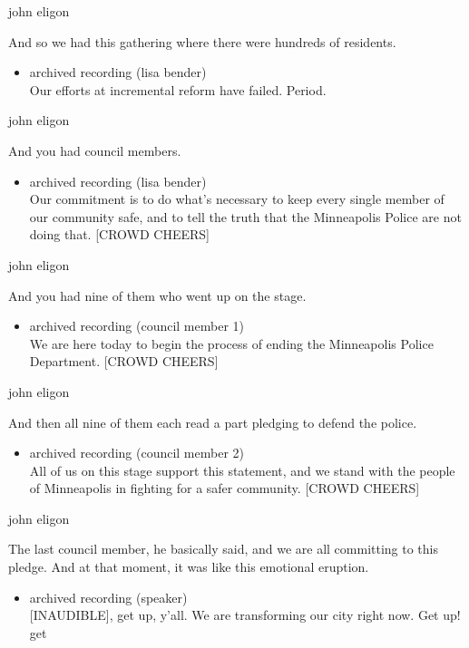 john eligon

And so we had this gathering where there were hundreds of residents.

\begin{itemize}
\tightlist
\item
  archived recording (lisa bender)\\
  Our efforts at incremental reform have failed. Period.
\end{itemize}

john eligon

And you had council members.

\begin{itemize}
\tightlist
\item
  archived recording (lisa bender)\\
  Our commitment is to do what's necessary to keep every single member
  of our community safe, and to tell the truth that the Minneapolis
  Police are not doing that. {[}CROWD CHEERS{]}
\end{itemize}

john eligon

And you had nine of them who went up on the stage.

\begin{itemize}
\tightlist
\item
  archived recording (council member 1)\\
  We are here today to begin the process of ending the Minneapolis
  Police Department. {[}CROWD CHEERS{]}
\end{itemize}

john eligon

And then all nine of them each read a part pledging to defend the
police.

\begin{itemize}
\tightlist
\item
  archived recording (council member 2)\\
  All of us on this stage support this statement, and we stand with the
  people of Minneapolis in fighting for a safer community. {[}CROWD
  CHEERS{]}
\end{itemize}

john eligon

The last council member, he basically said, and we are all committing to
this pledge. And at that moment, it was like this emotional eruption.

\begin{itemize}
\tightlist
\item
  archived recording (speaker)\\
  {[}INAUDIBLE{]}, get up, y'all. We are transforming our city right
  now. Get up! get
\end{itemize}

